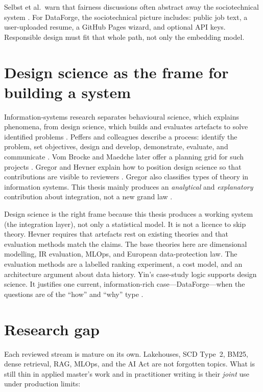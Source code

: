 Selbst et al.\ warn that fairness discussions often abstract away the sociotechnical system . For DataForge, the sociotechnical picture includes: public job text, a user-uploaded resume, a GitHub Pages wizard, and optional API keys. Responsible design must fit that whole path, not only the embedding model.

\section{Design science as the frame for building a system}
\label{sec:dsr-theory}

Information-systems research separates behavioural science, which explains phenomena, from design science, which builds and evaluates artefacts to solve identified problems . Peffers and colleagues describe a process: identify the problem, set objectives, design and develop, demonstrate, evaluate, and communicate . Vom Brocke and Maedche later offer a planning grid for such projects . Gregor and Hevner explain how to position design science so that contributions are visible to reviewers . Gregor also classifies types of theory in information systems. This thesis mainly produces an \emph{analytical} and \emph{explanatory} contribution about integration, not a new grand law .

Design science is the right frame because this thesis produces a working system (the integration layer), not only a statistical model. It is not a licence to skip theory. Hevner requires that artefacts rest on existing theories and that evaluation methods match the claims. The base theories here are dimensional modelling, IR evaluation, MLOps, and European data-protection law. The evaluation methods are a labelled ranking experiment, a cost model, and an architecture argument about data history. Yin's case-study logic supports design science. It justifies one current, information-rich case---DataForge---when the questions are of the ``how'' and ``why'' type .

\section{Research gap}
\label{sec:gap}

Each reviewed stream is mature on its own. Lakehouses, SCD Type~2, BM25, dense retrieval, RAG, MLOps, and the AI Act are not forgotten topics. What is still thin in applied master's work and in practitioner writing is their \emph{joint} use under production limits:


